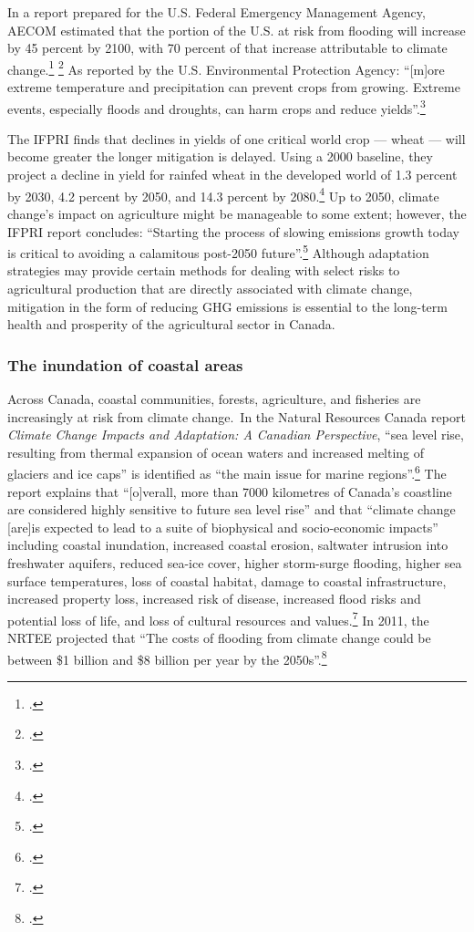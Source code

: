 In a report prepared for the U.S. Federal Emergency Management Agency, AECOM estimated that the portion of the U.S. at risk from flooding will increase by 45 percent by 2100, with 70 percent of that increase attributable to climate change.\footcite[][p. ES-7]{FEMAFlood} \footcite[See also: ][]{MJFlood}
As reported by the U.S. Environmental Protection Agency: ``[m]ore extreme temperature and precipitation can prevent crops from growing. Extreme events, especially floods and droughts, can harm crops and reduce yields''.\footcite[][]{EPAAgFoodImpacts}



The IFPRI finds that declines in yields of one critical world crop --- wheat --- will become greater the longer mitigation is delayed. 
Using a 2000 baseline, they project a decline in yield for rainfed wheat in the developed world of 1.3 percent by 2030, 4.2 percent by 2050, and 14.3 percent by 2080.\footcite[][p. 85]{Farming2050}
Up to 2050, climate change's impact on agriculture might be manageable to some extent; however, the IFPRI report concludes: ``Starting the process of slowing emissions growth today is critical to avoiding a calamitous post-2050 future''.\footcite[][p. xxi]{Farming2050}
Although adaptation strategies may provide certain methods for dealing with select risks to agricultural production that are directly associated with climate change, mitigation in the form of reducing GHG emissions is essential to the long-term health and prosperity of the agricultural sector in Canada.



	\subsubsection{The inundation of coastal areas}
	\label{sec:inundationcoastal}

	
	
Across Canada, coastal communities, forests, agriculture, and fisheries are increasingly at risk from climate change.\
In the Natural Resources Canada report \emph{Climate Change Impacts and Adaptation: A Canadian Perspective}, ``sea level rise, resulting from thermal expansion of ocean waters and increased melting of glaciers and ice caps'' is identified as ``the main issue for marine regions''.\footcite[][p. xvi]{Lemmen2010}
The report explains that ``[o]verall, more than 7000 kilometres of Canada's coastline are considered highly sensitive to future sea level rise'' and that ``climate change [are]is expected to lead to a suite of biophysical and socio-economic impacts'' including coastal inundation, increased coastal erosion, saltwater intrusion into freshwater aquifers, reduced sea-ice cover, higher storm-surge flooding, higher sea surface temperatures, loss of coastal habitat, damage to coastal infrastructure, increased property loss, increased risk of disease, increased flood risks and potential loss of life, and loss of cultural resources and values.\footcite[][p. xvii]{Lemmen2010}
In 2011, the NRTEE projected that ``The costs of flooding from climate change could be between \$1 billion and \$8 billion per year by the 2050s''.\footcite[][p.16]{NRTEEPrice}



